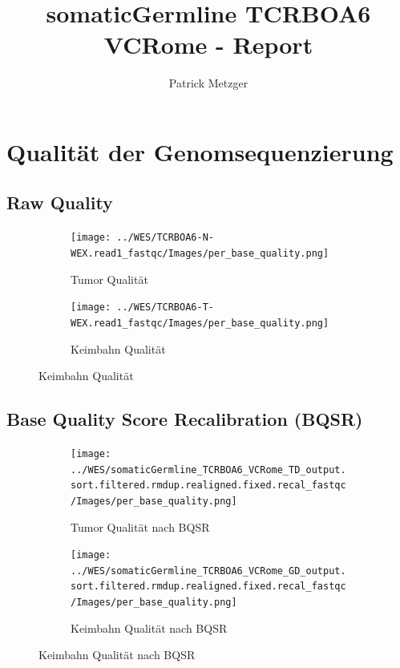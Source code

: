 \documentclass[woside,a4paper,12pt]{article}\usepackage[]{graphicx}\usepackage[]{color}
\begin{document}
\title{somaticGermline TCRBOA6 VCRome - Report}

\author{Patrick Metzger}

\maketitle
\tableofcontents
\clearpage

\section{Qualität der Genomsequenzierung}
\subsection{Raw Quality}

\begin{figure}[H]
  \centering
    \begin{subfigure}[b]{0.45\textwidth}
      \texttt{[image: ../WES/TCRBOA6-N-WEX.read1\_fastqc/Images/per\_base\_quality.png]}
      \caption{Tumor Qualität}
      \label{fig:1}
    \end{subfigure}
    \begin{subfigure}[b]{0.45\textwidth}
      \texttt{[image: ../WES/TCRBOA6-T-WEX.read1\_fastqc/Images/per\_base\_quality.png]}
      \caption{Keimbahn Qualität}
      \label{fig:2}
    \end{subfigure}
\end{figure}

\subsection{Base Quality Score Recalibration (BQSR)}

\begin{figure}[H]
  \centering
    \begin{subfigure}[b]{0.45\textwidth}
      \texttt{[image: ../WES/somaticGermline\_TCRBOA6\_VCRome\_TD\_output.sort.filtered.rmdup.realigned.fixed.recal\_fastqc/Images/per\_base\_quality.png]}
      \caption{Tumor Qualität nach BQSR}
      \label{fig:3}
    \end{subfigure}
    \begin{subfigure}[b]{0.45\textwidth}
      \texttt{[image: ../WES/somaticGermline\_TCRBOA6\_VCRome\_GD\_output.sort.filtered.rmdup.realigned.fixed.recal\_fastqc/Images/per\_base\_quality.png]}
      \caption{Keimbahn Qualität nach BQSR}
      \label{fig:4}
    \end{subfigure}
\end{figure}
\end{document}
